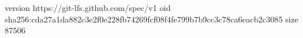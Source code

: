 version https://git-lfs.github.com/spec/v1
oid sha256:cda27a1da882c3e2f0e228fb74269fcf08f4fe799b7b9cc3c78ca6eacb2c3085
size 87506
